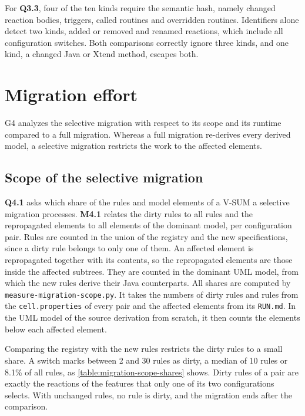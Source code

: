 For \textbf{Q3.3}, four of the ten kinds require the semantic hash, namely changed reaction bodies, triggers, called routines and overridden routines.
Identifiers alone detect two kinds, added or removed and renamed reactions, which include all configuration switches.
Both comparisons correctly ignore three kinds, and one kind, a changed Java or Xtend method, escapes both.

\section{Migration effort}
\label{sec:Evaluation:MigrationEffort}

G4 analyzes the selective migration with respect to its scope and its runtime compared to a full migration.
Whereas a full migration re-derives every derived model, a selective migration restricts the work to the affected elements.

\subsection{Scope of the selective migration}
\label{sec:Evaluation:MigrationEffort:ScopeOfTheSelectiveMigration}

\textbf{Q4.1} asks which share of the rules and model elements of a V-SUM a selective migration processes.
\textbf{M4.1} relates the dirty rules to all rules and the repropagated elements to all elements of the dominant model, per configuration pair.
Rules are counted in the union of the registry and the new specifications, since a dirty rule belongs to only one of them.
An affected element is repropagated together with its contents, so the repropagated elements are those inside the affected subtrees.
They are counted in the dominant UML model, from which the new rules derive their Java counterparts.
All shares are computed by \texttt{measure-migration-scope.py}.
It takes the numbers of dirty rules and rules from the \texttt{cell.properties} of every pair and the affected elements from its \texttt{RUN.md}.
In the UML model of the source derivation from scratch, it then counts the elements below each affected element.

Comparing the registry with the new rules restricts the dirty rules to a small share.
A switch marks between 2 and 30 rules as dirty, a median of 10 rules or 8.1\% of all rules, as \autoref{table:migration-scope-shares} shows.
Dirty rules of a pair are exactly the reactions of the features that only one of its two configurations selects.
With unchanged rules, no rule is dirty, and the migration ends after the comparison.

